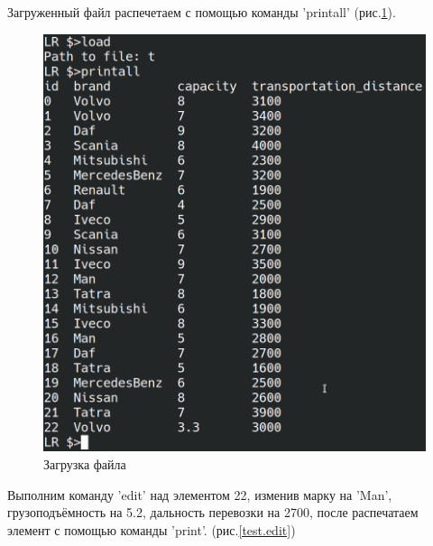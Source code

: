 Загруженный файл распечетаем с 
помощью команды 'printall' (рис.\ref{test.bigload}).

\begin{figure}[H]
    \centering
    \includegraphics[width=0.9\linewidth]{photo/test.bigload}
    \caption{Загрузка файла}
    \label{test.bigload}
\end{figure}

Выполним команду 'edit' над элементом 22, изменив 
марку на 'Man',
грузоподъёмность на 5.2,
дальность перевозки на 2700,
после распечатаем элемент с помощью команды 'print'.
(рис.\ref{test.edit})

